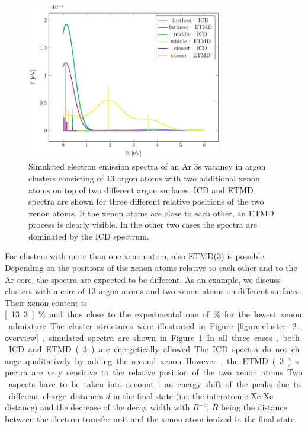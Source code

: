\begin{figure}[ht]
 \centering
 \includegraphics[width=8.5cm]{pics/2tops.pdf}
 \caption{Simulated electron emission spectra of an Ar 3s vacancy in 
          argon clusters consisting of 13
          argon atoms with two additional xenon atoms on top of two different
          argon surfaces. ICD and ETMD spectra are shown for three
          different relative positions of the two xenon atoms. If 
          the xenon atoms are close to each other, an ETMD process is
          clearly visible. In the other two cases the spectra are dominated by
          the ICD spectrum.}
 \label{figure:2tops}
\end{figure}
%
For clusters with more than one xenon atom, also ETMD(3) is possible.
Depending on the positions of the xenon atoms relative to each other and to the Ar core, the spectra are expected to be different.
As an example, we discuss clusters with a core of 13 argon atoms and two xenon atoms on different surfaces. 
Their xenon content is \unit[13.3]{\%} and thus close to the experimental one of \unit[10-12]{\%} for the lowest xenon admixture.
The cluster structures were illustrated in Figure \ref{figure:cluster_2_overview}, simulated spectra are shown in Figure \ref{figure:2tops}.
In all three cases, both ICD and ETMD(3) are energetically allowed. The ICD
spectra do not change qualitatively by adding the second xenon.
However, the ETMD(3) spectra
are very sensitive to the relative position of the two xenon atoms.
Two aspects have to be taken into account: an energy shift of the peaks due
to different charge distances $d$ in the final state (i.e. the interatomic Xe-Xe
distance) and the decrease of the decay width with $R^{-6}$, $R$ being the distance
between the electron transfer unit and the xenon atom ionized in the final state.
